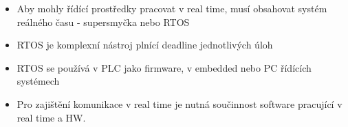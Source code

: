 \begin{itemize}
    \item Aby mohly řídící prostředky pracovat v real time, musí obsahovat systém reálného času - supersmyčka nebo RTOS
    \item RTOS je komplexní nástroj plnící deadline jednotlivých úloh
    \item RTOS se používá v PLC jako firmware, v embedded nebo PC řídících systémech
    \item Pro zajištění komunikace v real time je nutná součinnost software pracující v real time a HW.
\end{itemize}


